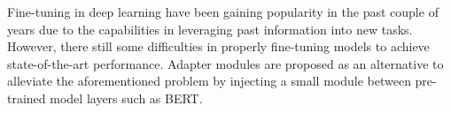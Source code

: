
Fine-tuning in deep learning have been gaining popularity in the past couple of years due to the
capabilities in leveraging past information into new tasks. However, there still some difficulties
in properly fine-tuning models to achieve state-of-the-art performance. Adapter modules are
proposed as an alternative to alleviate the aforementioned problem by injecting a small module
between pre-trained model layers such as BERT.
